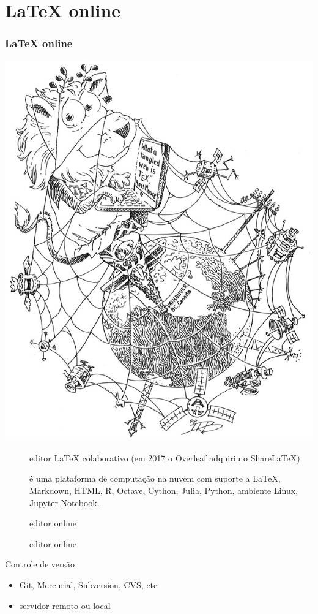 \section{LaTeX online}

\begin{frame}[allowframebreaks]
\frametitle{\LaTeX{} online}

\centering
\includegraphics[width=0.4\linewidth,height=0.7\textheight,keepaspectratio]{figures/lion05.png}

\framebreak

\begin{description}
\item[] editor \LaTeX{} colaborativo (em 2017 o Overleaf adquiriu o ShareLaTeX)
\item[] é uma plataforma de computação na nuvem com suporte a \LaTeX{}, 
Markdown, HTML, R, Octave, Cython, Julia, Python, ambiente Linux, Jupyter Notebook.
\item[] editor online
\item[] editor online
\item[]
\end{description}


Controle de versão
\begin{itemize}
\item Git, Mercurial, Subversion, CVS, etc
\item servidor remoto ou local
\end{itemize}
\end{frame}
